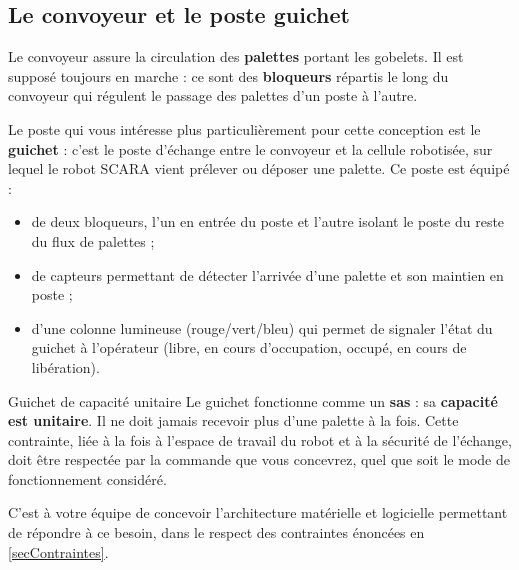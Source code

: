 \subsection{Le convoyeur et le poste guichet}

Le convoyeur assure la circulation des \textbf{palettes} portant les
gobelets. Il est supposé toujours en marche : ce sont des \textbf{bloqueurs}
répartis le long du convoyeur qui régulent le passage des palettes d'un
poste à l'autre.

Le poste qui vous intéresse plus particulièrement pour cette conception est
le \textbf{guichet} : c'est le poste d'échange entre le convoyeur et la
cellule robotisée, sur lequel le robot SCARA vient prélever ou déposer une
palette. Ce poste est équipé :
\begin{itemize}
    \item de deux bloqueurs, l'un en entrée du poste et l'autre isolant le
    poste du reste du flux de palettes ;
    \item de capteurs permettant de détecter l'arrivée d'une palette et son
    maintien en poste ;
    \item d'une colonne lumineuse (rouge/vert/bleu) qui permet de signaler
    l'état du guichet à l'opérateur (libre, en cours d'occupation, occupé,
    en cours de libération).
\end{itemize}

\begin{UPSTIwarning}{Guichet de capacité unitaire}
Le guichet fonctionne comme un \textbf{sas} : sa \textbf{capacité est
unitaire}. Il ne doit jamais recevoir plus d'une palette à la fois. Cette
contrainte, liée à la fois à l'espace de travail du robot et à la sécurité
de l'échange, doit être respectée par la commande que vous concevrez,
quel que soit le mode de fonctionnement considéré.
\end{UPSTIwarning}

C'est à votre équipe de concevoir l'architecture matérielle et logicielle
permettant de répondre à ce besoin, dans le respect des contraintes énoncées
en \cref{secContraintes}.
